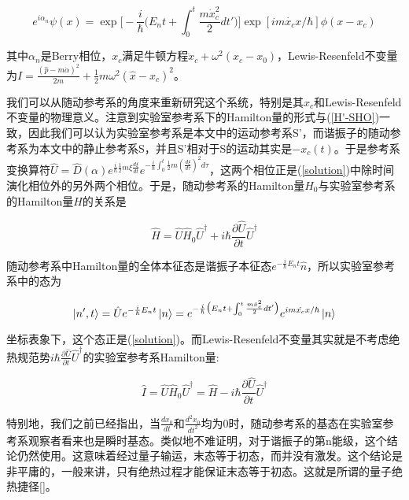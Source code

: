 \documentclass[a4paper]{article}
\begin{document}
        \begin{equation}\label{solution}
            e^{i\alpha_n}\psi(x) = \exp\bigl[-\frac{i}{\hbar}\bigl(E_nt+\int_0^t\frac{m\dot{x}_c^2}{2}dt'\bigr)\bigr] \exp[im\dot{x_c}x/\hbar] \phi(x-x_c)
        \end{equation}

        其中$\alpha_n$是Berry相位，$x_c$满足牛顿方程$\ddot{x}_c+\omega^2(x_c-x_0)$，Lewis-Resenfeld不变量为$I=\frac{(\hat{p}-m\dot{\alpha})^2}{2m}+\frac{1}{2}m\omega^2(\hat{x}-x_c)^2$。
        
        我们可以从随动参考系的角度来重新研究这个系统，特别是其$x_c$和Lewis-Resenfeld不变量的物理意义。注意到实验室参考系下的Hamilton量的形式与(\ref{H'-SHO})一致，因此我们可以认为实验室参考系是本文中的运动参考系S'，而谐振子的随动参考系为本文中的静止参考系S，并且S'相对于S的运动其实是$-x_c(t)$。于是参考系变换算符$\hat{U}=\hat{D}(\alpha)e^{\frac{i}{\hbar}\frac{1}{2}m\xi\frac{d\xi}{dt}}e^{-\frac{i}{\hbar}\int_0^t\frac{1}{2}m(\frac{d \xi}{d\tau})^2 d\tau}$，这两个相位正是(\ref{solution})中除时间演化相位外的另外两个相位。于是，随动参考系的Hamilton量$\hat{H}_0$与实验室参考系的Hamilton量$\hat{H}$的关系是

        \begin{equation}
            \hat{H}=\hat{U}\hat{H}_0\hat{U}^\dagger+i\hbar\frac{\partial\hat{U}}{\partial t}\hat{U}^\dagger
        \end{equation}

        随动参考系中Hamilton量的全体本征态是谐振子本征态$e^{-\frac{i}{\hbar}E_nt}\hat{n}$，所以实验室参考系中的态为

        \begin{equation}
            \ket{n',t}=\hat{U}e^{-\frac{i}{\hbar}E_nt}\ket{n}=e^{-\frac{i}{\hbar}\bigl(E_nt+\int_0^t\frac{m\dot{x}_c^2}{2}dt'\bigr)} e^{im\dot{x_c}x/\hbar} \ket{n}
        \end{equation}

        坐标表象下，这个态正是(\ref{solution})。而Lewis-Resenfeld不变量其实就是不考虑绝热规范势$i\hbar\frac{\partial\hat{U}}{\partial t}\hat{U}^\dagger$的实验室参考系Hamilton量:

        \begin{equation}
            \hat{I}=\hat{U}\hat{H}_0\hat{U}^\dagger=\hat{H}-i\hbar\frac{\partial\hat{U}}{\partial t}\hat{U}^\dagger
        \end{equation}

        特别地，我们之前已经指出，当$\frac{dx_0}{dt}$和$\frac{d^2x_0}{dt^2}$均为0时，随动参考系的基态在实验室参考系观察者看来也是瞬时基态。类似地不难证明，对于谐振子的第n能级，这个结论仍然使用。这意味着经过量子输运，末态等于初态，而并没有激发。这个结论是非平庸的，一般来讲，只有绝热过程才能保证末态等于初态。这就是所谓的量子绝热捷径[]。
\end{document}
